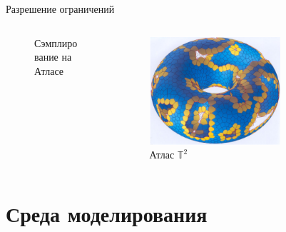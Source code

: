 \documentclass[11pt, aspectratio=169]{beamer}
\begin{document}
\begin{frame}{Разрешение ограничений}
\begin{columns}[onlytextwidth]
\begin{column}{0.49\textwidth}
\begin{figure}
                \caption{Сэмплирование на Атласе}
                \label{fig:atlas_sampling}
            \end{figure}
        \end{column}
        \begin{column}{0.49\textwidth}
            \begin{figure}
                \centering
                \includegraphics[width=0.7\textwidth]{figures/atlas_on_tor.png}
                \caption{Атлас $\mathbb{T}^2$}
                \label{fig:atlas_sampling}
            \end{figure}
        \end{column}
    \end{columns}
\end{frame}

\section{Среда моделирования}
\end{document}

